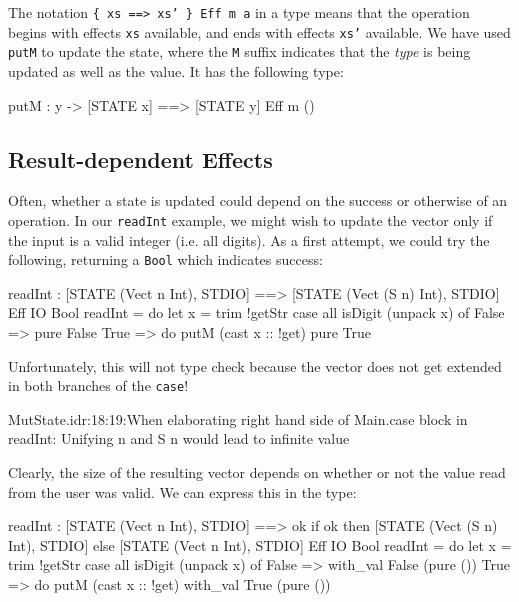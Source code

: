 \noindent
The notation \texttt{\{ xs ==> xs' \} Eff m a} in a type means that the
operation begins with effects \texttt{xs} available, and ends with effects
\texttt{xs'} available. We have used \texttt{putM} to update the state, where
the \texttt{M} suffix indicates that the \emph{type} is being updated as well
as the value. It has the following type:

\begin{code}
putM : y -> { [STATE x] ==> [STATE y] } Eff m () 
\end{code}

\subsection{Result-dependent Effects}

Often, whether a state is updated could depend on the success or otherwise
of an operation. In our \texttt{readInt} example, we might wish to update
the vector only if the input is a valid integer (i.e. all digits). As a
first attempt, we could try the following, returning a \texttt{Bool} which
indicates success:

\begin{code}
readInt : { [STATE (Vect n Int), STDIO] ==>
            [STATE (Vect (S n) Int), STDIO] } Eff IO Bool
readInt = do let x = trim !getStr
             case all isDigit (unpack x) of
                  False => pure False
                  True => do putM (cast x :: !get)
                             pure True
\end{code}

\noindent
Unfortunately, this will not type check because the vector does not get
extended in both branches of the \texttt{case}!

\begin{code}
MutState.idr:18:19:When elaborating right hand side of Main.case 
block in readInt:
Unifying n and S n would lead to infinite value
\end{code}

\noindent
Clearly, the size of the resulting vector depends on whether or not the
value read from the user was valid. We can express this in the type:

\begin{code}
readInt : { [STATE (Vect n Int), STDIO] ==>
            {ok} if ok then [STATE (Vect (S n) Int), STDIO]
                       else [STATE (Vect n Int), STDIO] } Eff IO Bool
readInt = do let x = trim !getStr
             case all isDigit (unpack x) of
                  False => with_val False (pure ())
                  True => do putM (cast x :: !get)
                             with_val True (pure ())
\end{code}


